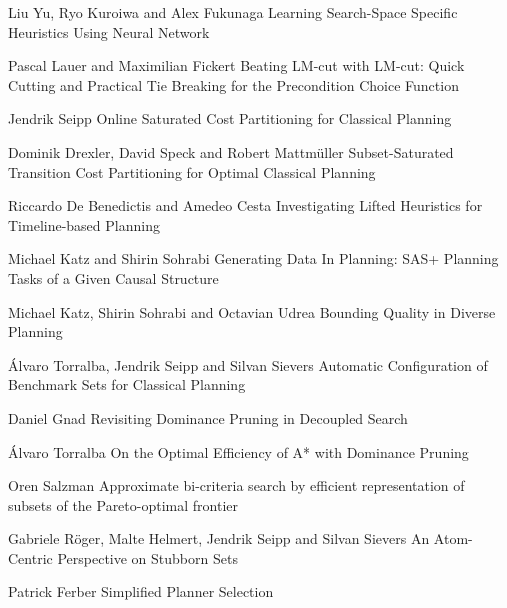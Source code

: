 {
Liu Yu, Ryo Kuroiwa and Alex Fukunaga
}
{
Learning Search-Space Specific Heuristics Using Neural Network
}

{
Pascal Lauer and Maximilian Fickert
}
{ Beating LM-cut with LM-cut: Quick Cutting and Practical Tie Breaking for the
Precondition Choice Function
}

{
Jendrik Seipp
}
{
Online Saturated Cost Partitioning for Classical Planning
}

{
Dominik Drexler, David Speck and Robert Mattmüller
}
{
Subset-Saturated Transition Cost Partitioning for Optimal Classical Planning
}

{
Riccardo De Benedictis and Amedeo Cesta
}
{
Investigating Lifted Heuristics for Timeline-based Planning
}

{
Michael Katz and Shirin Sohrabi
}
{
Generating Data In Planning: SAS+ Planning Tasks of a Given Causal Structure
}

{
Michael Katz, Shirin Sohrabi and Octavian Udrea
}
{
Bounding Quality in Diverse Planning
}

{
\'{A}lvaro Torralba, Jendrik Seipp and Silvan Sievers
}
{
Automatic Configuration of Benchmark Sets for Classical Planning
}


{
Daniel Gnad
}
{
Revisiting Dominance Pruning in Decoupled Search
}


{
\'{A}lvaro Torralba
}
{
On the Optimal Efficiency of A* with Dominance Pruning
}


{
Oren Salzman
}
{Approximate bi-criteria search by efficient representation of subsets of the
Pareto-optimal frontier }


{
Gabriele R\"{o}ger, Malte Helmert, Jendrik Seipp and Silvan Sievers
}
{
An Atom-Centric Perspective on Stubborn Sets
}

{
Patrick Ferber
}
{
Simplified Planner Selection
}
